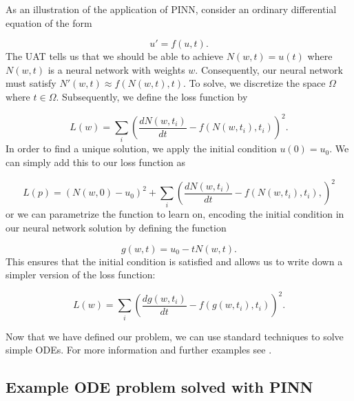 \documentclass{CUP-JNL-DTM}%
\theoremstyle{definition}
\numberwithin{equation}{section}
\begin{document}
As an illustration of the application of PINN, consider an ordinary differential equation of the form 

\begin{equation}
	u' = f(u,t). 
\end{equation}
The UAT tells us that we should be able to achieve $N(w,t) = u(t)$ where $N(w,t)$ is a neural network with weights $w$. Consequently, our neural network must satisfy $N'(w,t) \approx f(N(w,t), t)$. To solve, we discretize the space $\Omega$ where $t \in \Omega$. Subsequently, we define the loss function by 

\begin{equation}
	L(w) = \sum_i \left( \frac{dN(w, t_i)}{dt} - f(N(w,t_i), t_i)\right)^2. 
\end{equation}
In order to find a unique solution, we apply the initial condition $u(0) = u_0$. We can simply add this to our loss function as 

\begin{equation}
	L(p) = (N(w,0) - u_0)^2 + \sum_i \left( \frac{dN(w,t_i)}{dt} - f(N(w,t_i), t_i),\right)^2
\end{equation}
or we can parametrize the function to learn on, encoding the initial condition in our neural network solution by defining the function 

\begin{equation}
	g(w,t) = u_0 - tN(w,t).
\end{equation}
This ensures that the initial condition is satisfied and allows us to write down a simpler version of the loss function:

\begin{equation}
	L(w) = \sum_i \left(\frac{dg(w,t_i)}{dt} - f(g(w,t_i), t_i)\right)^2. 
\end{equation}

Now that we have defined our problem, we can use standard techniques to solve simple ODEs. For more information and further examples see \cite{rackauckasSciMLSciMLBookParallel}. 

\subsection{Example ODE problem solved with PINN}
\end{document}
